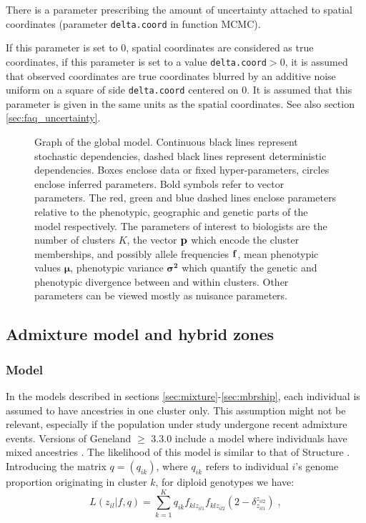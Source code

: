 \documentclass[a4paper,10pt]{article}
\begin{document}
There is a parameter prescribing the amount of uncertainty attached to spatial coordinates (parameter \texttt{delta.coord} in function MCMC).

If this parameter is set to 0, spatial coordinates are
    considered as true coordinates, if this parameter is set to a value  \texttt{delta.coord}$>$0, 
it is assumed that observed
  coordinates are true coordinates blurred by an additive noise uniform
  on a square of side \texttt{delta.coord} centered on 0. It is assumed that this parameter is given in  the same units as 
the spatial coordinates. See also section \ref{sec:faq_uncertainty}. 



\begin{figure}[h]
\vspace{-2cm}
\hspace{-1cm}

\caption{Graph of the global model. 
Continuous black lines represent stochastic dependencies, dashed black lines represent 
deterministic dependencies. Boxes enclose data or fixed hyper-parameters, circles enclose inferred parameters. 
Bold symbols refer to vector parameters. 
The red, green and blue dashed lines enclose parameters relative to the phenotypic, 
geographic and genetic parts 
of the model respectively. The parameters of interest to biologists are the number of clusters $K$, 
the vector ${\bf p}$ which encode the cluster memberships,
and possibly  allele frequencies ${\bf f}$, mean phenotypic values $\bm{ \mu}$, phenotypic variance  $\bm{ \sigma^2}$ 
which quantify the genetic and phenotypic 
divergence between and within clusters. 
Other parameters can be viewed mostly as nuisance parameters.}\label{fig:global_dag}
\end{figure}

\clearpage

\subsection{Admixture model and hybrid zones} 

\subsubsection{Model}

In the models described in sections \ref{sec:mixture}-\ref{sec:mbrship}, each individual is assumed to have ancestries in one cluster only. 
This assumption might not be relevant, especially if the population under study undergone recent admixture events. 
Versions of {\sc Geneland} $\geq$  3.3.0 include a model where individuals have mixed ancestries \citep{Guedj11}. 
The likelihood of this model is similar to that of {\sc Structure} \citep{Pritchard00}.
Introducing the matrix $q=(q_{ik})$, where $q_{ik}$ refers to individual $i$'s genome proportion originating in cluster $k$, 
for diploid genotypes we have:
\begin{equation}\label{eq:admix_like}
L(z_{il} | f,q) = \sum_{k=1}^K q_{ik} f_{klz_{il1}}f_{klz_{il2}} (2- \delta_{z_{il1}}^{z_{il2}}) \;,
\end{equation}
\end{document}
